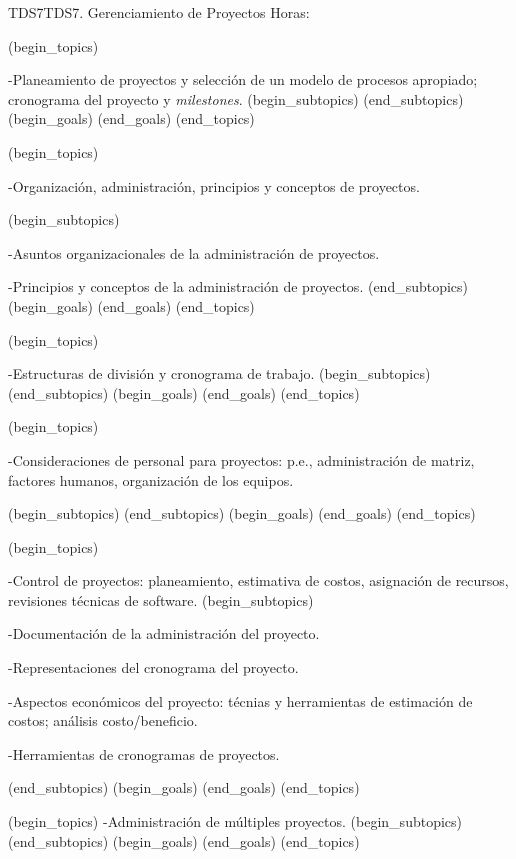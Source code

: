 \begin{BKL2}{TDS7}{TDS7. Gerenciamiento de Proyectos}
Horas:
 
(begin_topics)

-Planeamiento de proyectos y selección de un modelo de procesos apropiado; cronograma del proyecto y {\it milestones}.
(begin_subtopics)
(end_subtopics)
(begin_goals)
(end_goals)
(end_topics)

 

(begin_topics)

-Organización, administración, principios y conceptos de proyectos.

(begin_subtopics)

-Asuntos organizacionales de la administración de proyectos.

-Principios y conceptos de la administración de proyectos.
(end_subtopics)
(begin_goals)
(end_goals)
(end_topics)

 

(begin_topics)

-Estructuras de división y cronograma de trabajo.
(begin_subtopics)
(end_subtopics)
(begin_goals)
(end_goals)
(end_topics)

 

(begin_topics)

-Consideraciones de personal para proyectos: p.e., administración de matriz, factores humanos, organización de los equipos.

(begin_subtopics)
(end_subtopics)
(begin_goals)
(end_goals)
(end_topics)

 

(begin_topics)

-Control de proyectos: planeamiento, estimativa de costos, asignación de recursos, revisiones técnicas de software.
(begin_subtopics)

-Documentación de la administración del proyecto.

-Representaciones del cronograma del proyecto.

-Aspectos económicos del proyecto: técnias y herramientas de estimación de costos; análisis costo/beneficio.

-Herramientas de cronogramas de proyectos.

(end_subtopics)
(begin_goals)
(end_goals)
(end_topics)

 

(begin_topics)
-Administración de múltiples proyectos.
(begin_subtopics)
(end_subtopics)
(begin_goals)
(end_goals)
(end_topics)

 


\end{BKL2}
